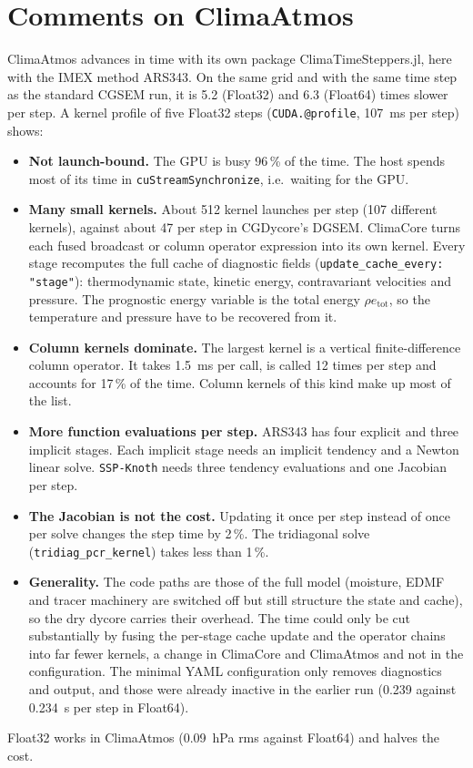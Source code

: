 \documentclass[11pt,a4paper]{article}
\newcommand{\code}[1]{\texttt{#1}}
\begin{document}
\section{Comments on ClimaAtmos}

ClimaAtmos advances in time with its own package ClimaTimeSteppers.jl,
here with the IMEX method ARS343. On the same grid and with the same time
step as the standard CGSEM run, it is 5.2 (Float32) and 6.3 (Float64) times
slower per step. A kernel profile of five Float32 steps
(\code{CUDA.@profile}, 107~ms per step) shows:
\begin{itemize}
\item \textbf{Not launch-bound.} The GPU is busy 96\,\% of the time.
  The host spends most of its time in \code{cuStreamSynchronize}, i.e.\
  waiting for the GPU.
\item \textbf{Many small kernels.} About 512 kernel launches per step
  (107 different kernels), against about 47 per step in CGDycore's DGSEM.
  ClimaCore turns each fused broadcast or column operator expression into
  its own kernel. Every stage recomputes the full cache of diagnostic fields
  (\code{update\_cache\_every: "stage"}): thermodynamic state, kinetic
  energy, contravariant velocities and pressure. The prognostic energy
  variable is the total energy $\rho e_\text{tot}$, so the temperature and
  pressure have to be recovered from it.
\item \textbf{Column kernels dominate.} The largest kernel is a vertical
  finite-difference column operator. It takes 1.5~ms per call, is called 12
  times per step and accounts for 17\,\% of the time. Column kernels of this
  kind make up most of the list.
\item \textbf{More function evaluations per step.} ARS343 has four
  explicit and three implicit stages. Each implicit stage needs an implicit
  tendency and a Newton linear solve. \code{SSP-Knoth} needs three tendency
  evaluations and one Jacobian per step.
\item \textbf{The Jacobian is not the cost.} Updating it once per step
  instead of once per solve changes the step time by 2\,\%. The tridiagonal
  solve (\code{tridiag\_pcr\_kernel}) takes less than 1\,\%.
\item \textbf{Generality.} The code paths are those of the full model
  (moisture, EDMF and tracer machinery are switched off but still structure
  the state and cache), so the dry dycore carries their overhead. The time
  could only be cut substantially by fusing the per-stage cache update and
  the operator chains into far fewer kernels, a change in ClimaCore and
  ClimaAtmos and not in the configuration. The minimal YAML configuration
  only removes diagnostics and output, and those were already inactive in
  the earlier run (0.239 against 0.234~s per step in Float64).
\end{itemize}
Float32 works in ClimaAtmos (0.09~hPa rms against Float64) and halves the
cost.
\end{document}
